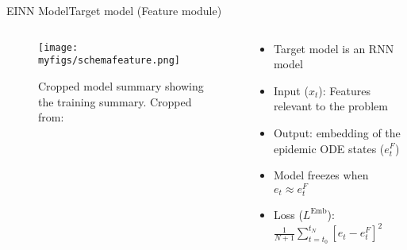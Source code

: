 \documentclass[
	aspectratio=169,	%
	onlytextwidth,		%
	t,					%
	]{beamer}
\begin{document}

\begin{frame}[fragile]{EINN Model}{Target model (Feature module)}
	\begin{columns}
		
		\begin{column}[T]{.5\textwidth}
			\begin{figure}
				\texttt{[image: myfigs/schemafeature.png]}
				\caption{Cropped model summary showing the training summary. Cropped from:~\cite{main}}
			\end{figure}
		\end{column}
		
		\begin{column}[T]{.5\textwidth}
			\begin{itemize}
				\item<1-> Target model is an RNN model
				\item<2-> Input ($x_{t}$): Features relevant to the problem 
				\item<3-> Output: embedding of the epidemic ODE states ($e_{t}^{F}$)
				\item <4-> Model freezes when $e_{t} \approx e_{t}^{F}$
				\item <5-> Loss ($L^{\text{Emb}}$): $\frac{1}{N+1} \sum_{t=t_{0}}^{t_{N}} \left[ e_{t} - e_{t}^{F} \right]^{2} $
			\end{itemize}
		\end{column}
			
	\end{columns}
\end{frame}
\end{document}
